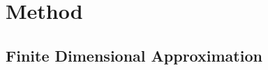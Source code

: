 \documentclass[a4paper,10pt]{article}  %
\begin{document}
\section{Method} %
\label{sec:method}

\subsection{Finite Dimensional Approximation} %
\label{sub:finite_dimensional_approximation}
\end{document}
